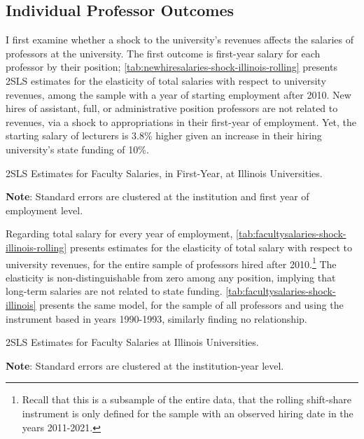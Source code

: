 \documentclass[notitlepage,12pt]{article}
\begin{document}
\subsection{Individual Professor Outcomes}

I first examine whether a shock to the university's revenues affects the salaries of professors at the university.
The first outcome is first-year salary for each professor by their position;
\autoref{tab:newhiresalaries-shock-illinois-rolling} presents 2SLS estimates for the elasticity of total salaries with respect to university revenues, among the sample with a year of starting employment after 2010.
New hires of assistant, full, or administrative position professors are not related to revenues, via a shock to appropriations in their first-year of employment.
Yet, the starting salary of lecturers is 3.8\% higher given an increase in their hiring university's state funding of 10\%.

\begin{table}[h!]
    \singlespacing
    \centering
    \caption{2SLS Estimates for Faculty Salaries, in First-Year, at Illinois Universities.}
    \makebox[\textwidth][c]{}
    \begin{flushleft}
        \footnotesize
        \textbf{Note}: Standard errors are clustered at the institution and first year of employment level. 
    \end{flushleft}
    \label{tab:newhiresalaries-shock-illinois-rolling}
\end{table}

Regarding total salary for every year of employment, \autoref{tab:facultysalaries-shock-illinois-rolling} presents estimates for the elasticity of total salary with respect to university revenues, for the entire sample of professors hired after 2010.\footnote{
    Recall that this is a subsample of the entire data, that the rolling shift-share instrument is only defined for the sample with an observed hiring date in the years 2011-2021.
}
The elasticity is non-distinguishable from zero among any position, implying that long-term salaries are not related to state funding.
\autoref{tab:facultysalaries-shock-illinois} presents the same model, for the sample of all professors and using the instrument based in years 1990-1993, similarly finding no relationship.

\begin{table}[h!]
    \singlespacing
    \centering
    \caption{2SLS Estimates for Faculty Salaries at Illinois Universities.}
    \makebox[\textwidth][c]{}
    \begin{flushleft}
        \footnotesize
        \textbf{Note}: Standard errors are clustered at the institution-year level.
    \end{flushleft}
    \label{tab:facultysalaries-shock-illinois-rolling}
\end{table}
\end{document}
